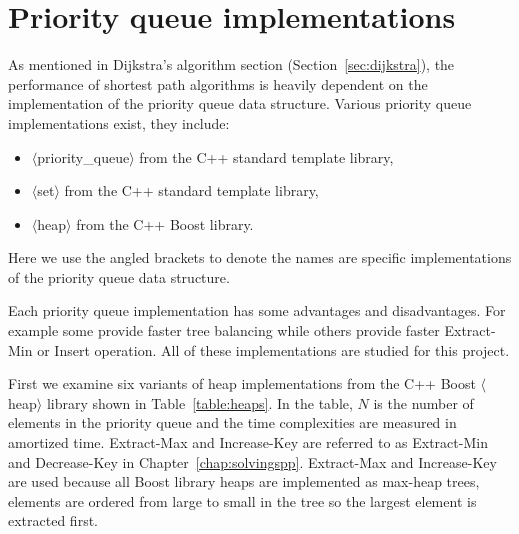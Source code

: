 \section{Priority queue implementations} \label{sec:pq_implementation}
As mentioned in Dijkstra's algorithm section (Section~\ref{sec:dijkstra}),
the performance of shortest path algorithms is heavily dependent on the implementation of the priority queue data structure.
Various priority queue implementations exist,
they include:
\begin{itemize}
    \item $\langle$priority\_queue$\rangle$ from the C++ standard template library,
    \item $\langle$set$\rangle$ from the C++ standard template library,
    \item $\langle$heap$\rangle$ from the C++ Boost library.
\end{itemize}
Here we use the angled brackets to denote the names are specific implementations of the priority queue data structure.

Each priority queue implementation has some advantages and disadvantages.
For example some provide faster tree balancing while others provide faster Extract-Min or Insert operation.
All of these implementations are studied for this project.

First we examine six variants of heap implementations from the C++ Boost $\langle$heap$\rangle$ library shown in Table~\ref{table:heaps}.
In the table, $N$ is the number of elements in the priority queue and
the time complexities are measured in amortized time.
Extract-Max and Increase-Key are referred to as Extract-Min and Decrease-Key in Chapter~\ref{chap:solvingspp}.
Extract-Max and Increase-Key are used because
all Boost library heaps are implemented as max-heap trees,
elements are ordered from large to small in the tree so
the largest element is extracted first.

